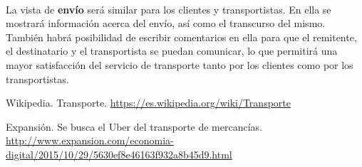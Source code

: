 \documentclass[10pt, a4paper,spanish]{article}
\begin{document}
			\paragraph{}
			La vista de \textbf{envío} será similar para los clientes y transportistas. En ella se mostrará información acerca del envío, así como el transcurso del mismo. También habrá posibilidad de escribir comentarios en ella para que el remitente, el destinatario y el transportista se puedan comunicar, lo que permitirá una  mayor satisfacción del servicio de transporte tanto por los clientes como por los transportistas.
	\begin{thebibliography}{9}

		Wikipedia. Transporte. \url{https://es.wikipedia.org/wiki/Transporte}

		Expansión. Se busca el Uber del transporte de mercancías. \url{http://www.expansion.com/economia-digital/2015/10/29/5630ef8e46163f932a8b45d9.html}

	\end{thebibliography}
\end{document}
